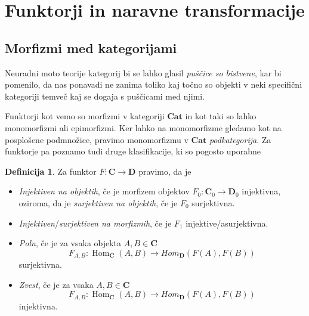 \documentclass[12pt,a4paper]{book}
\theoremstyle{definition}
\newtheorem{definicija}{Definicija}[chapter]
\theoremstyle{plain}
\theoremstyle{definition}
\theoremstyle{remark}
\newcommand{\cat}[1]{\textbf{#1}}
\DeclareMathOperator{\Hom}{Hom}
\begin{document}
\section{Funktorji in naravne transformacije}

\subsection{Morfizmi med kategorijami}

Neuradni moto teorije kategorij bi se lahko glasil \textit{puščice so bistvene},
kar bi pomenilo, da nas ponavadi ne zanima toliko kaj točno so objekti v neki specifični kategoriji temveč kaj se dogaja s puščicami med njimi.

Funktorji kot vemo so morfizmi v kategoriji $\cat{Cat}$ in kot taki so lahko monomorfizmi ali epimorfizmi. Ker lahko na monomorfizme gledamo kot na posplošene podmnožice, pravimo monomorfizmu v $\cat{Cat}$ \emph{podkategorija}. Za funktorje pa poznamo tudi druge klasifikacije, ki so pogosto uporabne

\begin{definicija}
Za funktor $F : \cat{C} \to \cat{D}$ pravimo, da je 
\begin{itemize}
\item \emph{Injektiven na objektih}, če je morfizem objektov $F_0 : \cat{C}_0 \to \cat{D}_0$ injektivna, oziroma, da je \emph{surjektiven na objektih}, če je $F_0$ surjektivna.
\item \emph{Injektiven}/\emph{surjektiven na morfizmih}, če je $F_1$ injektive/asurjektivna.
\item \emph{Poln}, če je za vsaka objekta $A,B \in \cat{C}$
$$F_{A,B} : \Hom_{\cat{C}}(A,B) \to Hom_{\cat{D}}(F(A),F(B))$$
surjektivna.
\item \emph{Zvest}, če je za vsaka $A,B \in \cat{C}$
$$F_{A,B} : \Hom_{\cat{C}}(A,B) \to Hom_{\cat{D}}(F(A),F(B))$$
injektivna.
\end{itemize}
\end{definicija}
\end{document}
